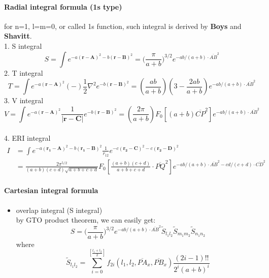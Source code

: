 \documentclass[11pt]{article}
\providecommand{\tightlist}{%
      \setlength{\itemsep}{0pt}\setlength{\parskip}{0pt}}
\begin{document}
    \paragraph{Radial integral formula (1s
type)}\label{radial-integral-formula-1s-type}

for n=1, l=m=0, or called 1s function, such integral is derived by
\textbf{Boys} and \textbf{Shavitt}.\\
1. S integral\\
\[ S = \int e^{-a(\mathbf{r}-\mathbf{A})^2 - b(\mathbf{r}-\mathbf{B})^2} 
= \big( \frac{\pi}{a+b} \big)^{3/2} e^{-ab/(a+b)\cdot \overline{AB}^2 }
\] 2. T integral\\
\[ T = \int e^{-a(\mathbf{r}-\mathbf{A})^2}(-)\frac{1}{2}\nabla^2 e^{- b(\mathbf{r}-\mathbf{B})^2} 
= (\frac{ab}{a+b})(3-\frac{2ab}{a+b}) e^{-ab/(a+b)\cdot \overline{AB}^2 }
\] 3. V integral\\
\[ V = \int e^{-a(\mathbf{r}-\mathbf{A})^2} \frac{1}{|\mathbf{r}-\mathbf{C}|} e^{- b(\mathbf{r}-\mathbf{B})^2} 
= (\frac{2\pi}{a+b}) F_0[(a+b)\overline{CP}^2] e^{-ab/(a+b)\cdot \overline{AB}^2 }
\]\\
4. ERI integral
\begin{align*}
 I &= \int e^{-a(\mathbf{r_1}-\mathbf{A})^2 - b(\mathbf{r_1}-\mathbf{B})^2} \frac{1}{r_{12}} e^{- c(\mathbf{r_2}-\mathbf{C})^2 - c(\mathbf{r_2}-\mathbf{D})^2} 
\\
&= \frac{2\pi^{5/2}}{(a+b)(c+d)\sqrt{a+b+c+d}} F_0[\frac{(a+b)(c+d)}{a+b+c+d}\cdot\overline{PQ}^2] 
e^{-ab/(a+b)\cdot \overline{AB}^2 - cd/(c+d)\cdot \overline{CD}^2 }
\end{align*}

    \paragraph{Cartesian integral formula}\label{cartesian-integral-formula}

\begin{itemize}
\tightlist
\item
  overlap integral (S integral)\\
  by GTO product theorem, we can easily get:\\
  \[
  S =\big(\frac{\pi}{a+b}\big)^{3/2} e^{-ab/(a+b)\cdot \overline{AB}^2}\tilde{S}_{l_1l_2}
  \tilde{S}_{m_1m_2} \tilde{S}_{n_1n_2}
  \] where\\
  \[
  \tilde{S}_{l_1l_2} = \sum_{i=0}^{[\frac{l_1+l_2}{2}]} f_{2i}(l_1,l_2,\overline{PA}_x,\overline{PB}_x) \frac{(2i-1)!!}{2^i (a+b)^i}
  \]
\end{itemize}
\end{document}
